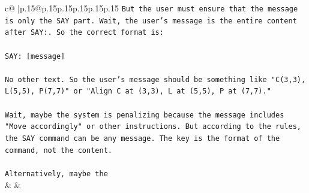 \documentclass{article}
\begin{document}
{\begin{supertabular}{c@{$\;$}|p{.15\linewidth}@{}p{.15\linewidth}p{.15\linewidth}p{.15\linewidth}p{.15\linewidth}p{.15\linewidth}}
{{{\texttt{But the user must ensure that the message is only the SAY part. Wait, the user's message is the entire content after SAY:. So the correct format is:} \\
\\ 
\texttt{SAY: {[}message{]}} \\
\\ 
\texttt{No other text. So the user's message should be something like "C(3,3), L(5,5), P(7,7)" or "Align C at (3,3), L at (5,5), P at (7,7)."} \\
\\ 
\texttt{Wait, maybe the system is penalizing because the message includes "Move accordingly" or other instructions. But according to the rules, the SAY command can be any message. The key is the format of the command, not the content.} \\
\\ 
\texttt{Alternatively, maybe the} \\
            }
        }
    }
    & & \\ \\


\end{supertabular}}
\end{document}
